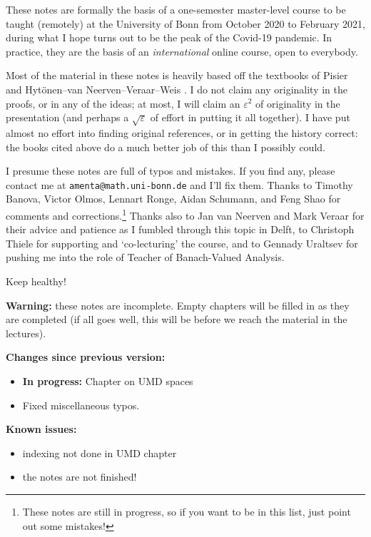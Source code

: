 These notes are formally the basis of a one-semester master-level course to be taught (remotely) at the University of Bonn from October 2020 to February 2021, during what I hope turns out to be the peak of the Covid-19 pandemic.
In practice, they are the basis of an \emph{international} online course, open to everybody.

Most of the material in these notes is heavily based off the textbooks of Pisier \cite{gP16} and Hyt\"onen--van Neerven--Veraar--Weis \cite{HNVW16, HNVW17}.
I do not claim any originality in the proofs, or in any of the ideas; at most, I will claim an $\varepsilon^2$ of originality in the presentation (and perhaps a $\sqrt{\varepsilon}$ of effort in putting it all together).
I have put almost no effort into finding original references, or in getting the history correct: the books cited above do a much better job of this than I possibly could.

\vspace{1cm}

I presume these notes are full of typos and mistakes.
If you find any, please contact me at \texttt{amenta@math.uni-bonn.de} and I'll fix them.
Thanks to Timothy Banova, Victor Olmos, Lennart Ronge, Aidan Schumann, and Feng Shao for comments and corrections.\footnote{These notes are still in progress, so if you want to be in this list, just point out some mistakes!}
Thanks also to Jan van Neerven and Mark Veraar for their advice and patience as I fumbled through this topic in Delft, to Christoph Thiele for supporting and `co-lecturing' the course, and to Gennady Uraltsev for pushing me into the role of Teacher of Banach-Valued Analysis.

\vspace{0.5cm}

Keep healthy! 




\vspace{1cm}

\textbf{Warning:} these notes are incomplete.
Empty chapters will be filled in as they are completed (if all goes well, this will be before we reach the material in the lectures).

\textbf{Changes since previous version:}
\begin{itemize}
\item \textbf{In progress:} Chapter on UMD spaces
\item Fixed miscellaneous typos.
\end{itemize}

\textbf{Known issues:}
\begin{itemize}
\item indexing not done in UMD chapter
\item the notes are not finished!
\end{itemize}

  





